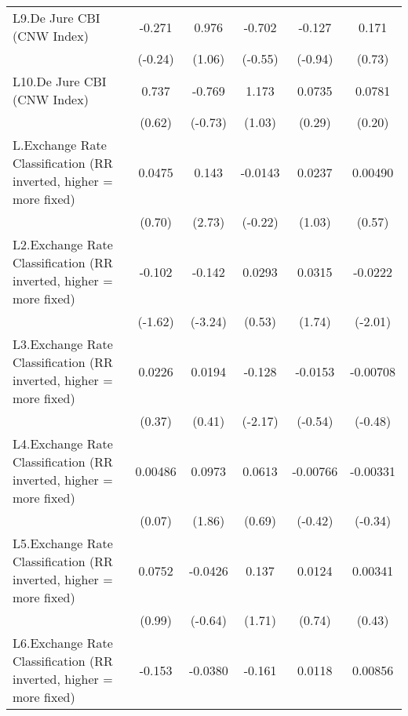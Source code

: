 {\begin{longtable}{l*{5}{c}}
\addlinespace
L9.De Jure CBI (CNW Index)&   -0.271         &    0.976         &   -0.702         &   -0.127         &    0.171         \\
                &  (-0.24)         &   (1.06)         &  (-0.55)         &  (-0.94)         &   (0.73)         \\
\addlinespace
L10.De Jure CBI (CNW Index)&    0.737         &   -0.769         &    1.173         &   0.0735         &   0.0781         \\
                &   (0.62)         &  (-0.73)         &   (1.03)         &   (0.29)         &   (0.20)         \\
\addlinespace
L.Exchange Rate Classification (RR inverted, higher = more fixed)&   0.0475         &    0.143\sym{**} &  -0.0143         &   0.0237         &  0.00490         \\
                &   (0.70)         &   (2.73)         &  (-0.22)         &   (1.03)         &   (0.57)         \\
\addlinespace
L2.Exchange Rate Classification (RR inverted, higher = more fixed)&   -0.102         &   -0.142\sym{**} &   0.0293         &   0.0315         &  -0.0222\sym{*}  \\
                &  (-1.62)         &  (-3.24)         &   (0.53)         &   (1.74)         &  (-2.01)         \\
\addlinespace
L3.Exchange Rate Classification (RR inverted, higher = more fixed)&   0.0226         &   0.0194         &   -0.128\sym{*}  &  -0.0153         & -0.00708         \\
                &   (0.37)         &   (0.41)         &  (-2.17)         &  (-0.54)         &  (-0.48)         \\
\addlinespace
L4.Exchange Rate Classification (RR inverted, higher = more fixed)&  0.00486         &   0.0973         &   0.0613         & -0.00766         & -0.00331         \\
                &   (0.07)         &   (1.86)         &   (0.69)         &  (-0.42)         &  (-0.34)         \\
\addlinespace
L5.Exchange Rate Classification (RR inverted, higher = more fixed)&   0.0752         &  -0.0426         &    0.137         &   0.0124         &  0.00341         \\
                &   (0.99)         &  (-0.64)         &   (1.71)         &   (0.74)         &   (0.43)         \\
\addlinespace
L6.Exchange Rate Classification (RR inverted, higher = more fixed)&   -0.153\sym{*}  &  -0.0380         &   -0.161\sym{***}&   0.0118         &  0.00856         \\

\end{longtable}}
